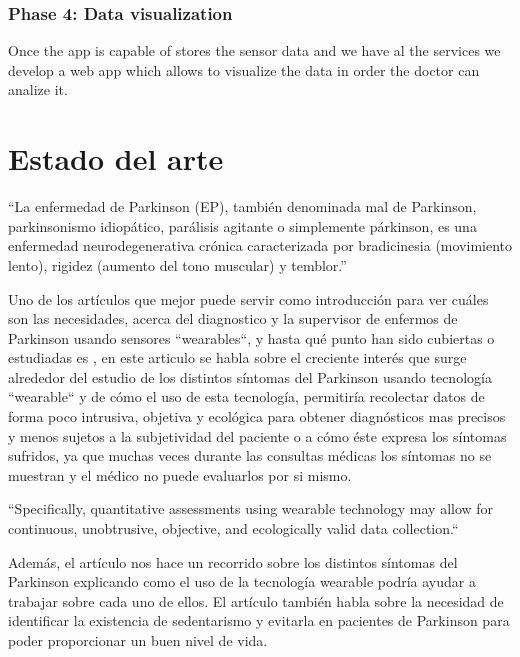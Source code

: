 \documentclass[11pt,spanish]{article}
\begin{document}
\subsubsection{Phase 4: Data visualization}

Once the app is capable of stores the sensor data and we have al the services we develop a web app which allows to visualize the data in order the doctor can analize it.
\newpage

\section{Estado del arte}

“La enfermedad de Parkinson (EP), también denominada mal de Parkinson, parkinsonismo idiopático, parálisis agitante o simplemente párkinson, es una enfermedad neurodegenerativa crónica caracterizada por bradicinesia (movimiento lento), rigidez (aumento del tono muscular) y temblor.” \cite{Wikipedia} 
\newline

Uno de los artículos que mejor puede servir como introducción para ver cuáles son las necesidades, acerca del diagnostico y la supervisor de enfermos de Parkinson usando sensores ``wearables``, y hasta qué punto han sido cubiertas o estudiadas es \cite{resumen2}, en este articulo se habla sobre el creciente interés que surge alrededor del estudio de los distintos síntomas del Parkinson usando tecnología ``wearable`` y de cómo el uso de esta tecnología, permitiría recolectar datos de forma poco intrusiva, objetiva y ecológica para obtener diagnósticos mas precisos y menos sujetos a la subjetividad del paciente o a cómo éste expresa los síntomas sufridos, ya que muchas veces durante las consultas médicas los síntomas no se muestran y el médico no puede evaluarlos por si mismo.
\newline

``Specifically, quantitative assessments using wearable technology may allow for continuous, unobtrusive, objective, and ecologically valid data collection.``
\newline

Además, el artículo nos hace un recorrido sobre los distintos síntomas del Parkinson explicando como el uso de la tecnología wearable podría ayudar a trabajar sobre cada uno de ellos. El artículo también habla sobre la necesidad de identificar la existencia de sedentarismo y evitarla en pacientes de Parkinson para poder proporcionar un buen nivel de vida.
\newline
\end{document}
